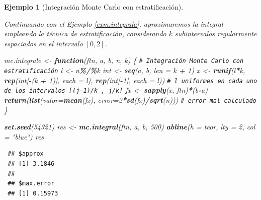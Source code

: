 \documentclass[
  spanish,
  10pt,
]{book}
\newenvironment{Shaded}{\begin{snugshade}}{\end{snugshade}}
\newcommand{\AttributeTok}[1]{\textcolor[rgb]{0.13,0.29,0.53}{#1}}
\newcommand{\CommentTok}[1]{\textcolor[rgb]{0.56,0.35,0.01}{\textit{#1}}}
\newcommand{\ControlFlowTok}[1]{\textcolor[rgb]{0.13,0.29,0.53}{\textbf{#1}}}
\newcommand{\DecValTok}[1]{\textcolor[rgb]{0.00,0.00,0.81}{#1}}
\newcommand{\FunctionTok}[1]{\textcolor[rgb]{0.13,0.29,0.53}{\textbf{#1}}}
\newcommand{\NormalTok}[1]{#1}
\newcommand{\OtherTok}[1]{\textcolor[rgb]{0.56,0.35,0.01}{#1}}
\newcommand{\SpecialCharTok}[1]{\textcolor[rgb]{0.81,0.36,0.00}{\textbf{#1}}}
\newcommand{\StringTok}[1]{\textcolor[rgb]{0.31,0.60,0.02}{#1}}
\theoremstyle{break}
\newtheorem{example}{Ejemplo}[chapter]
\theoremstyle{nonumberplain}
\renewcommand{\CommentTok}[1]{\textcolor[rgb]{0.41,0.41,0.41}{\texttt{#1}}}
\begin{document}
\begin{example}[Integración Monte Carlo con estratificación]
\protect\hypertarget{exm:integrale}{}\label{exm:integrale}

Continuando con el Ejemplo \ref{exm:integrala}, aproximaremos la integral empleando la técnica de estratificación, considerando \(k\) subintervalos regularmente espaciados en el intervalo \(\left[ 0, 2 \right]\).

\begin{Shaded}
\begin{Highlighting}[]
\NormalTok{mc.integrale }\OtherTok{\textless{}{-}} \ControlFlowTok{function}\NormalTok{(ftn, a, b, n, k) \{}
  \CommentTok{\# Integración Monte Carlo con estratificación}
\NormalTok{  l }\OtherTok{\textless{}{-}}\NormalTok{ n}\SpecialCharTok{\%/\%}\NormalTok{k}
\NormalTok{  int }\OtherTok{\textless{}{-}} \FunctionTok{seq}\NormalTok{(a, b, }\AttributeTok{len =}\NormalTok{ k }\SpecialCharTok{+} \DecValTok{1}\NormalTok{)}
\NormalTok{  x }\OtherTok{\textless{}{-}} \FunctionTok{runif}\NormalTok{(l}\SpecialCharTok{*}\NormalTok{k, }\FunctionTok{rep}\NormalTok{(int[}\SpecialCharTok{{-}}\NormalTok{(k }\SpecialCharTok{+} \DecValTok{1}\NormalTok{)], }\AttributeTok{each =}\NormalTok{ l), }\FunctionTok{rep}\NormalTok{(int[}\SpecialCharTok{{-}}\DecValTok{1}\NormalTok{], }\AttributeTok{each =}\NormalTok{ l))}
  \CommentTok{\# l uniformes en cada uno de los intervalos [(j{-}1)/k , j/k]}
\NormalTok{  fx }\OtherTok{\textless{}{-}} \FunctionTok{sapply}\NormalTok{(x, ftn)}\SpecialCharTok{*}\NormalTok{(b}\SpecialCharTok{{-}}\NormalTok{a)}
  \FunctionTok{return}\NormalTok{(}\FunctionTok{list}\NormalTok{(}\AttributeTok{valor=}\FunctionTok{mean}\NormalTok{(fx), }\AttributeTok{error=}\DecValTok{2}\SpecialCharTok{*}\FunctionTok{sd}\NormalTok{(fx)}\SpecialCharTok{/}\FunctionTok{sqrt}\NormalTok{(n)))   }\CommentTok{\# error mal calculado}
\NormalTok{\}}

\FunctionTok{set.seed}\NormalTok{(}\DecValTok{54321}\NormalTok{)}
\NormalTok{res }\OtherTok{\textless{}{-}} \FunctionTok{mc.integral}\NormalTok{(ftn, a, b, }\DecValTok{500}\NormalTok{)}
\FunctionTok{abline}\NormalTok{(}\AttributeTok{h =}\NormalTok{ teor, }\AttributeTok{lty =} \DecValTok{2}\NormalTok{, }\AttributeTok{col =} \StringTok{"blue"}\NormalTok{)}
\NormalTok{res}
\end{Highlighting}
\end{Shaded}

\begin{verbatim}
 ## $approx
 ## [1] 3.1846
 ## 
 ## $max.error
 ## [1] 0.15973
\end{verbatim}


\end{example}
\end{document}
